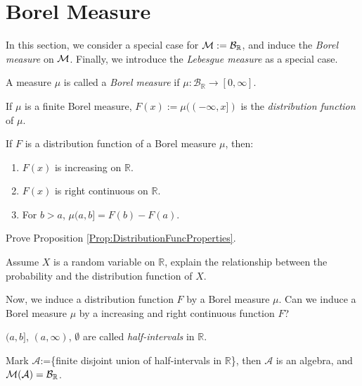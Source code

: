 \section{Borel Measure}
\begin{rem}
    In this section, we consider a special case for 
    $\mathcal{M}:=\mathcal{B}_{\mathbb{R}}$, and induce the 
    \textit{Borel measure} on $\mathcal{M}$. Finally, we introduce the 
    \textit{Lebesgue measure} as a special case.
\end{rem}
\begin{defn}
    \label{Defn:BorelMeas}
    A measure $\mu$ is called a \textit{Borel measure} if 
    $\mu:\mathcal{B}_{\mathbb{R}}\rightarrow[0,\infty]$.
\end{defn}
\begin{defn}
    \label{Defn:DistributionFunc}
    If $\mu$ is a finite Borel measure, $F(x):=\mu((-\infty,x])$ 
    is the \textit{distribution function} of $\mu$.
\end{defn}
\begin{prop}
    \label{Prop:DistributionFuncProperties}
    If $F$ is a distribution function of a Borel measure $\mu$, then:
    \begin{enumerate}
        \item $F(x)$ is increasing on $\mathbb{R}$. 
        \item $F(x)$ is right continuous on $\mathbb{R}$.
        \item For $b>a$, $\mu(a,b]=F(b)-F(a)$.
    \end{enumerate}
\end{prop}
\begin{exc}
    Prove Proposition \ref{Prop:DistributionFuncProperties}.
\end{exc}
\begin{exc}
    Assume $X$ is a random variable on $\mathbb{R}$, 
    explain the relationship between the probability and 
    the distribution function of $X$.
\end{exc}
\begin{rem}
    Now, we induce a distribution function $F$ by a Borel measure 
    $\mu$. Can we induce a Borel measure $\mu$ by a 
    increasing and right continuous function $F$?
\end{rem}
\begin{ntn}
    $(a,b]$, $(a,\infty)$, $\emptyset$ are called 
    \textit{half-intervals} in $\mathbb{R}$.
\end{ntn}
\begin{prop}
    \label{Prop:FiniteHalfIntAlg}
    Mark $\mathcal{A}$:=\{finite disjoint union of \newline
    half-intervals in $\mathbb{R}$\}, then 
    $\mathcal{A}$ is an algebra, 
    and $\mathcal{M}(\mathcal{A})=\mathcal{B}_{\mathbb{R}}$.
\end{prop}
